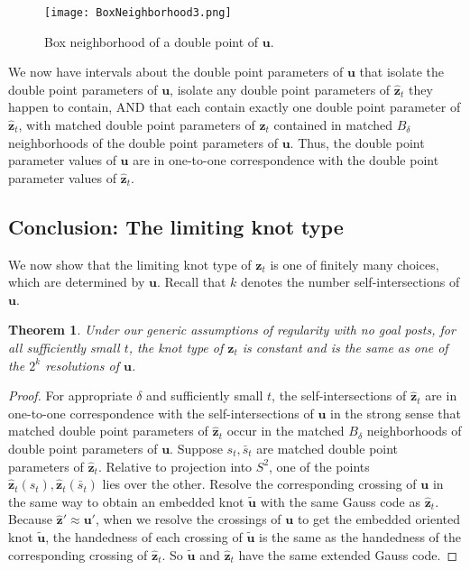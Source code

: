 \documentclass[12pt]{article}
\numberwithin{equation}{subsection}
\newtheorem{thm}{Theorem}
\theoremstyle{definition}
\numberwithin{lem}{section}
\def\uu{\mathbf{u}}
\def\zz{\mathbf{z}}
\def\zhat{\mathbf{\hat{z}}}
\begin{document}
\begin{figure}[h]
\begin{center}
\texttt{[image: BoxNeighborhood3.png]}
\end{center}
\caption{Box neighborhood of a double point of $\uu$.}
\label{fig:BoxNbd}
\end{figure}

We now have intervals about the double point parameters of $\uu$  that isolate the double point parameters of $\uu$, isolate any double point parameters of $\zhat_t$ they happen to contain, AND that each contain exactly one double point parameter of $\zhat_t$, with matched double point parameters of $\zhat_t$ contained in matched $B_\delta$ neighborhoods of the double point parameters of $\uu$.  Thus, the double point parameter values of $\uu$ are in one-to-one correspondence with the double point parameter values of $\zhat_t$.


\subsection{Conclusion: The limiting knot type}
 
We now show that the limiting knot type of $\zz_t$ is one of finitely many choices, which are determined by $\uu$.  Recall that $k$ denotes the number self-intersections of $\uu$.

\begin{thm}
Under our generic assumptions of regularity with {\em no goal posts}, for all sufficiently small $t$, the knot type of $\zz_t$ is constant and is the same as one of the $2^k$ resolutions of $\uu$.
\label{thm:2kknottype}
\end{thm}

\begin{proof}
 For appropriate $\delta$ and sufficiently small $t$, the self-intersections of $\hat{\zz}_t$ are in one-to-one correspondence with the self-intersections of $\uu$ in the strong sense that  matched double point parameters of $\zhat_t$ occur in the  matched $B_{\delta}$ neighborhoods of double point parameters of $\uu$.  Suppose $s_t, \bar{s}_t$ are matched double point parameters of $\zhat_t$. Relative to projection into $S^2$, one of the points $\zhat_t(s_t), \zhat_t(\bar{s}_t)$ lies over the other. Resolve the corresponding crossing of $\uu$ in the same way to obtain an embedded knot $\tilde{\uu}$ with the same  Gauss code as $\zhat_t$. 
 Because $\zhat' \approx \uu'$, when we resolve the crossings of $\uu$ to get the embedded oriented knot $\tilde{\uu}$, the handedness of each crossing of $\tilde{\uu}$ is the same as the handedness of the corresponding crossing of $\zhat_t$. So   $\tilde{\uu}$ and $\zhat_t$ have the same extended Gauss code.
  \end{proof}
  
\end{document}
